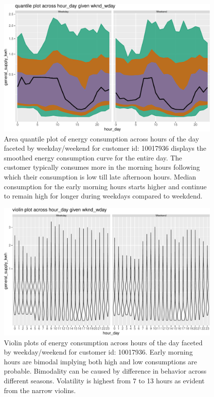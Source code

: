 \documentclass[12pt]{article}
\begin{document}
\begin{figure}

{\centering \includegraphics[width=\textwidth]{figure/bothcust-1} 

}

\caption{Area quantile plot of energy consumption across hours of the day faceted by weekday/weekend for customer id: 10017936 displays the smoothed energy consumption curve for the entire day. The customer typically consumes more in the morning hours following which their consumption is low till late afternoon hours. Median consumption for the early morning hours starts higher and continue to remain high for longer during weekdays compared to weekdend.}\label{fig:bothcust}
\end{figure}

\begin{figure}

{\centering \includegraphics[width=\textwidth]{figure/bothcust-lv-1} 

}

\caption{Violin plots of energy consumption across hours of the day faceted by weekday/weekend for customer id: 10017936. Early morning hours are bimodal implying both high and low consumptions are probable. Bimodality can be caused by difference in behavior across different seasons. Volatility is highest from 7 to 13 hours as evident from the narrow violins.}\label{fig:bothcust-lv}
\end{figure}
\end{document}
